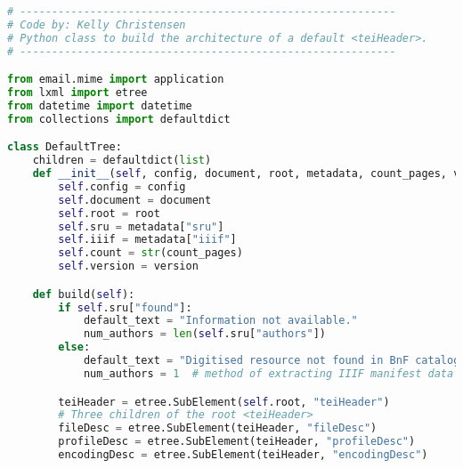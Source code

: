\documentclass[class=article, crop=false]{standalone}
\begin{document}
\begin{lstlisting}[language=python, style=python]
# -----------------------------------------------------------
# Code by: Kelly Christensen
# Python class to build the architecture of a default <teiHeader>.
# -----------------------------------------------------------

from email.mime import application
from lxml import etree
from datetime import datetime
from collections import defaultdict

class DefaultTree:
    children = defaultdict(list)
    def __init__(self, config, document, root, metadata, count_pages, version):
        self.config = config
        self.document = document
        self.root = root
        self.sru = metadata["sru"]
        self.iiif = metadata["iiif"]
        self.count = str(count_pages)
        self.version = version

    def build(self):
        if self.sru["found"]:
            default_text = "Information not available."
            num_authors = len(self.sru["authors"])
        else:
            default_text = "Digitised resource not found in BnF catalogue."
            num_authors = 1  # method of extracting IIIF manifest data will only return 1 author

        teiHeader = etree.SubElement(self.root, "teiHeader")
        # Three children of the root <teiHeader>
        fileDesc = etree.SubElement(teiHeader, "fileDesc")
        profileDesc = etree.SubElement(teiHeader, "profileDesc")
        encodingDesc = etree.SubElement(teiHeader, "encodingDesc")


\end{lstlisting}
\end{document}
